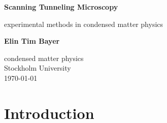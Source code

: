 \documentclass{article}
\begin{document}
\begin{titlepage}
    \begin{center}
        \vspace*{1cm}
            
        \Huge
        \textbf{Scanning Tunneling Microscopy}
            
        \vspace{0.5cm}
        \LARGE
        experimental methods in condensed matter physics
            
        \vspace{1.5cm}
            
        \textbf{Elin Tim Bayer}
            
        \vfill
            
        \Large
        condensed matter physics\\
        Stockholm University\\
        \today
    \end{center}
\end{titlepage}
\tableofcontents
\newpage
\section{Introduction}


\printbibliography
\end{document}

